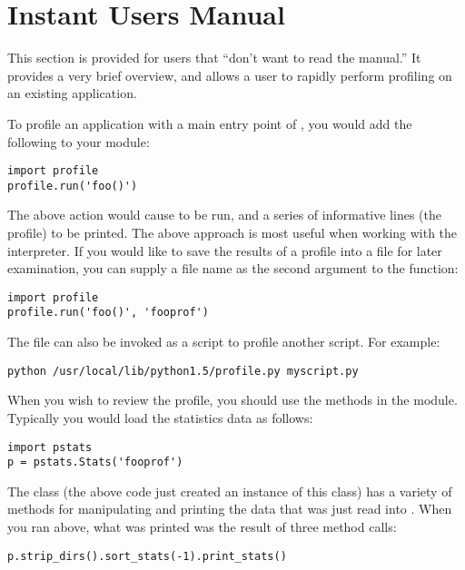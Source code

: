 \section{Instant Users Manual \label{profile-instant}}

This section is provided for users that ``don't want to read the
manual.'' It provides a very brief overview, and allows a user to
rapidly perform profiling on an existing application.

To profile an application with a main entry point of , you
would add the following to your module:

\begin{verbatim}
import profile
profile.run('foo()')
\end{verbatim}

The above action would cause  to be run, and a series of
informative lines (the profile) to be printed.  The above approach is
most useful when working with the interpreter.  If you would like to
save the results of a profile into a file for later examination, you
can supply a file name as the second argument to the 
function:

\begin{verbatim}
import profile
profile.run('foo()', 'fooprof')
\end{verbatim}

The file  can also be invoked as
a script to profile another script.  For example:

\begin{verbatim}
python /usr/local/lib/python1.5/profile.py myscript.py
\end{verbatim}

When you wish to review the profile, you should use the methods in the
 module.  Typically you would load the statistics data as
follows:

\begin{verbatim}
import pstats
p = pstats.Stats('fooprof')
\end{verbatim}

The class  (the above code just created an instance of
this class) has a variety of methods for manipulating and printing the
data that was just read into .  When you ran
 above, what was printed was the result of three
method calls:

\begin{verbatim}
p.strip_dirs().sort_stats(-1).print_stats()
\end{verbatim}

